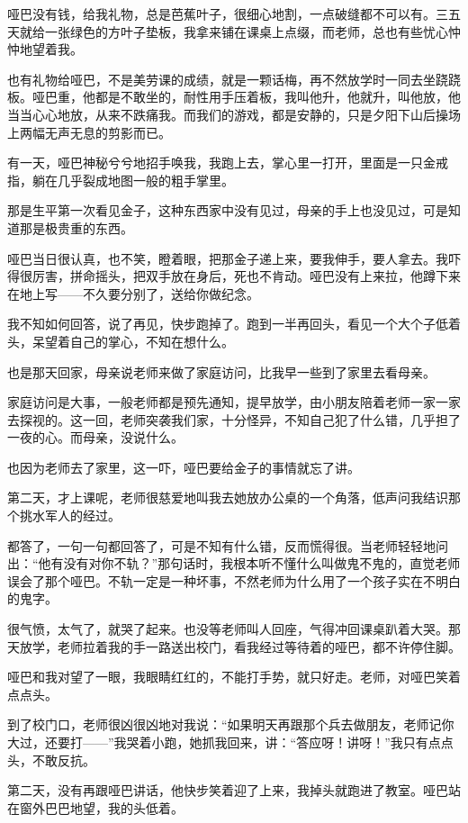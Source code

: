 \par 哑巴没有钱，给我礼物，总是芭蕉叶子，很细心地割，一点破缝都不可以有。三五天就给一张绿色的方叶子垫板，我拿来铺在课桌上点缀，而老师，总也有些忧心忡忡地望着我。
\par 也有礼物给哑巴，不是美劳课的成绩，就是一颗话梅，再不然放学时一同去坐跷跷板。哑巴重，他都是不敢坐的，耐性用手压着板，我叫他升，他就升，叫他放，他当当心心地放，从来不跌痛我。而我们的游戏，都是安静的，只是夕阳下山后操场上两幅无声无息的剪影而已。
\par 有一天，哑巴神秘兮兮地招手唤我，我跑上去，掌心里一打开，里面是一只金戒指，躺在几乎裂成地图一般的粗手掌里。
\par 那是生平第一次看见金子，这种东西家中没有见过，母亲的手上也没见过，可是知道那是极贵重的东西。
\par 哑巴当日很认真，也不笑，瞪着眼，把那金子递上来，要我伸手，要人拿去。我吓得很厉害，拼命摇头，把双手放在身后，死也不肯动。哑巴没有上来拉，他蹲下来在地上写——不久要分别了，送给你做纪念。
\par 我不知如何回答，说了再见，快步跑掉了。跑到一半再回头，看见一个大个子低着头，呆望着自己的掌心，不知在想什么。
\par 也是那天回家，母亲说老师来做了家庭访问，比我早一些到了家里去看母亲。
\par 家庭访问是大事，一般老师都是预先通知，提早放学，由小朋友陪着老师一家一家去探视的。这一回，老师突袭我们家，十分怪异，不知自己犯了什么错，几乎担了一夜的心。而母亲，没说什么。
\par 也因为老师去了家里，这一吓，哑巴要给金子的事情就忘了讲。
\par 第二天，才上课呢，老师很慈爱地叫我去她放办公桌的一个角落，低声问我结识那个挑水军人的经过。
\par 都答了，一句一句都回答了，可是不知有什么错，反而慌得很。当老师轻轻地问出：“他有没有对你不轨？”那句话时，我根本听不懂什么叫做鬼不鬼的，直觉老师误会了那个哑巴。不轨一定是一种坏事，不然老师为什么用了一个孩子实在不明白的鬼字。
\par 很气愤，太气了，就哭了起来。也没等老师叫人回座，气得冲回课桌趴着大哭。那天放学，老师拉着我的手一路送出校门，看我经过等待着的哑巴，都不许停住脚。
\par 哑巴和我对望了一眼，我眼睛红红的，不能打手势，就只好走。老师，对哑巴笑着点点头。
\par 到了校门口，老师很凶很凶地对我说：“如果明天再跟那个兵去做朋友，老师记你大过，还要打——”我哭着小跑，她抓我回来，讲：“答应呀！讲呀！”我只有点点头，不敢反抗。
\par 第二天，没有再跟哑巴讲话，他快步笑着迎了上来，我掉头就跑进了教室。哑巴站在窗外巴巴地望，我的头低着。
